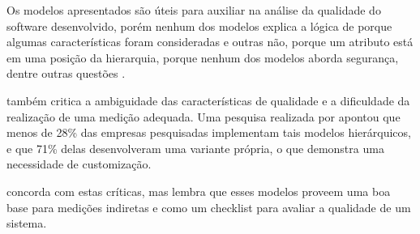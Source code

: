 \documentclass[
	12pt,				%
	openright,			%
	oneside,			%
	a4paper,			%
	english,			%
	brazil,				%
	]{abntex2}
\begin{document}
Os modelos apresentados são úteis para auxiliar na análise da qualidade do software desenvolvido, porém nenhum dos modelos explica a lógica de porque algumas características foram consideradas e outras não, porque um atributo está em uma posição da hierarquia, porque nenhum dos modelos aborda segurança, dentre outras questões \cite{PFLEEGER2010}.

 também critica a ambiguidade das características de qualidade e a dificuldade da realização de uma medição adequada. Uma pesquisa realizada por  apontou que menos de 28\% das empresas pesquisadas implementam tais modelos hierárquicos, e que 71\% delas desenvolveram uma variante própria, o que demonstra uma necessidade de customização.

 concorda com estas críticas, mas lembra que esses modelos proveem uma boa base para medições indiretas e como um checklist para avaliar a qualidade de um sistema.
\end{document}
